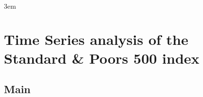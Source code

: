 \documentclass[10pt,twoside]{book}
\begin{document}
\emergencystretch 3em


\chapter{Time Series analysis of the Standard \& Poors 500 index}
\tableofcontents %
\clearpage

\section{Main}



% 

% 

% 

% 

% 


% 


% 
\end{document}
